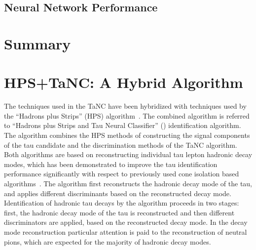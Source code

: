 \subsection{Neural Network Performance}
\label{sec:NeuralNetworkPerformance}

\section{Summary}


\section{HPS+TaNC: A Hybrid Algorithm}
\label{sec:TauId} 
%
The techniques used in the TaNC have been hybridized with techniques used by the
\newline ``Hadrons plus Strips'' (HPS) algorithm~\cite{CMS_AN_2010-082}.  The combined
algorithm is referred to ``Hadrons plus Strips and Tau Neural Classifier''
(\hpsTanc) identification algorithm.  The algorithm combines the HPS methods of
constructing the signal components of the tau candidate and the discrimination
methods of the TaNC algorithm.  Both algorithms are based on reconstructing
individual tau lepton hadronic decay modes, which has been demonstrated to
improve the tau identification performance significantly with respect to
previously used cone isolation based algorithms~\cite{CMS-PAS-PFT-10-004}.  The
\hpsTanc algorithm first reconstructs the hadronic decay mode of the tau, and
applies different discriminants based on the reconstructed decay mode.
Identification of hadronic tau decays by the \hpsTanc algorithm proceeds in two
stages: first, the hadronic decay mode of the tau is reconstructed and then
different discriminators are applied, based on the reconstructed decay mode.  In
the decay mode reconstruction particular attention is paid to the reconstruction
of neutral pions, which are expected for the majority of hadronic decay modes.

